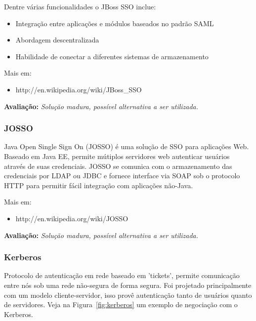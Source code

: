 \documentclass[11pt]{article}
\begin{document}
Dentre várias funcionalidades o JBoss SSO inclue:

\begin{itemize}
  \item{Integração entre aplicações e módulos baseados no padrão SAML}
  \item{Abordagem descentralizada}
  \item{Habilidade de conectar a diferentes sistemas de armazenamento}
\end{itemize}

Mais em:
\begin{itemize}
  \item{http://en.wikipedia.org/wiki/JBoss\_SSO}
\end{itemize}

{\bf Avaliação:} {\it Solução madura, possível alternativa a ser utilizada.}

\subsubsection{JOSSO}

Java Open Single Sign On (JOSSO) é uma solução de SSO para aplicações Web.
Baseado em Java EE, permite mútiplos servidores web autenticar
usuários através de suas credenciais. JOSSO se comunica com o armazenamento das
credenciais por LDAP ou JDBC e fornece interface via SOAP sob o protocolo HTTP
para permitir fácil integração com aplicações não-Java.

Mais em:
\begin{itemize}
  \item{http://en.wikipedia.org/wiki/JOSSO}
\end{itemize}

{\bf Avaliação:} {\it Solução madura, possível alternativa a ser utilizada.}

\subsubsection{Kerberos}

Protocolo de autenticação em rede baseado em 'tickets', permite comunicação
entre nós sob uma rede não-segura de forma segura. Foi projetado
principalmente com um modelo cliente-servidor, isso provê autenticação tanto
de usuários quanto de servidores. Veja na Figura~\ref{fig:kerberos} um exemplo
de negociação com o Kerberos.
\end{document}
